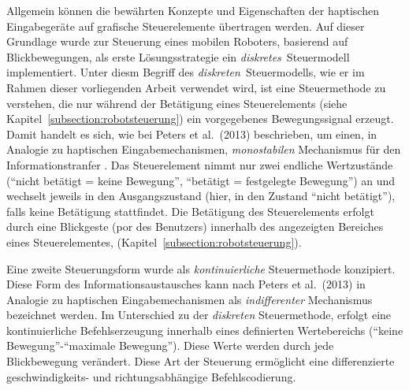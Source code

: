 Allgemein können die bewährten Konzepte und Eigenschaften der haptischen Eingabegeräte auf grafische Steuerelemente übertragen werden. Auf dieser Grundlage wurde zur Steuerung eines mobilen Roboters, basierend auf Blickbewegungen, als erste Lösungsstrategie ein \textit{diskretes}~Steuermodell implementiert. Unter diesm Begriff des \textit{diskreten}~Steuermodells, wie er im Rahmen dieser vorliegenden Arbeit verwendet wird, ist eine Steuermethode zu verstehen, die nur während der Betätigung eines Steuerelements (siehe Kapitel~\ref{subsection:robotsteuerung}) ein vorgegebenes Bewegungssignal erzeugt. Damit handelt es sich, wie bei Peters et al.~(2013) beschrieben, um einen, in Analogie zu haptischen Eingabemechanismen, \textit{monostabilen} Mechanismus für den Informationstranfer \cite{Peters2013}. Das Steuerelement nimmt nur zwei endliche Wertzustände (\enquote{nicht betätigt = keine Bewegung}, \enquote{betätigt = festgelegte Bewegung}) an und wechselt jeweils in den Ausgangszustand (hier, in den Zustand \enquote{nicht betätigt}), falls keine Betätigung stattfindet. Die Betätigung des Steuerelements erfolgt durch eine Blickgeste (\acs{por} des Benutzers) innerhalb des angezeigten Bereiches eines Steuerelementes, (\vgl Kapitel~\ref{subsection:robotsteuerung}).


Eine zweite Steuerungsform wurde als \textit{kontinuierliche} Steuermethode konzipiert. Diese Form des Informationsaustausches kann nach Peters et al.~(2013) in Analogie zu haptischen Eingabemechanismen als \textit{indifferenter} Mechanismus bezeichnet werden. Im Unterschied zu der \textit{diskreten} Steuermethode, erfolgt eine kontinuierliche Befehlserzeugung innerhalb eines definierten Wertebereichs (\enquote{keine Bewegung}-\enquote{maximale Bewegung}). Diese Werte werden durch jede Blickbewegung verändert. Diese Art der Steuerung ermöglicht eine differenzierte geschwindigkeits- und richtungsabhängige Befehlscodierung.  

